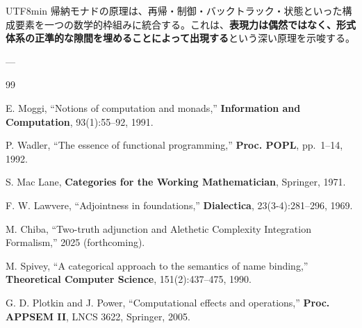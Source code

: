 \documentclass[a4paper,11pt]{article}
\renewcommand{\emph}[1]{\textbf{#1}}
\theoremstyle{definition}
\begin{document}
\begin{CJK}{UTF8}{min}
帰納モナドの原理は、再帰・制御・バックトラック・状態といった構成要素を一つの数学的枠組みに統合する。これは、\emph{表現力は偶然ではなく、形式体系の正準的な隙間を埋めることによって出現する}という深い原理を示唆する。

---

\begin{thebibliography}{99}

 E. Moggi, ``Notions of computation and monads,'' \emph{Information and Computation}, 93(1):55--92, 1991.

 P. Wadler, ``The essence of functional programming,'' \emph{Proc. POPL}, pp.~1--14, 1992.

 S. Mac Lane, \emph{Categories for the Working Mathematician}, Springer, 1971.

 F. W. Lawvere, ``Adjointness in foundations,'' \emph{Dialectica}, 23(3-4):281--296, 1969.

 M. Chiba, ``Two-truth adjunction and Alethetic Complexity Integration Formalism,'' 2025 (forthcoming).

 M. Spivey, ``A categorical approach to the semantics of name binding,'' \emph{Theoretical Computer Science}, 151(2):437--475, 1990.

 G. D. Plotkin and J. Power, ``Computational effects and operations,'' \emph{Proc. APPSEM II}, LNCS 3622, Springer, 2005.

\end{thebibliography}

\end{CJK}
\end{document}
